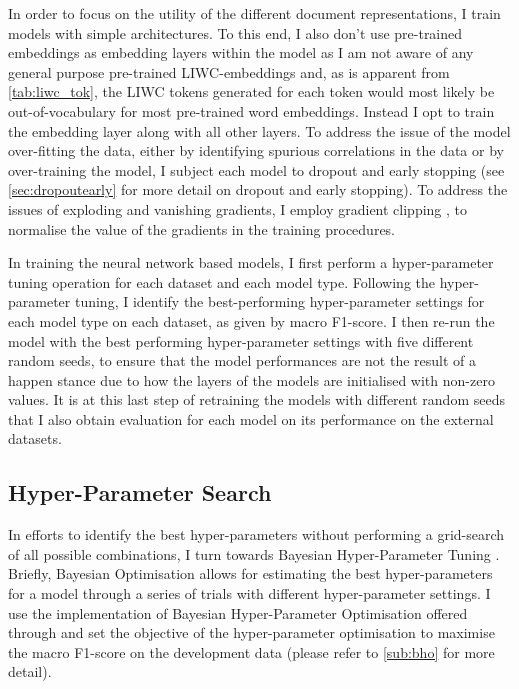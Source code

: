 In order to focus on the utility of the different document representations, I train models with simple architectures. To this end, I also don't use pre-trained embeddings as embedding layers within the model as I am not aware of any general purpose pre-trained LIWC-embeddings and, as is apparent from \cref{tab:liwc_tok}, the LIWC tokens generated for each token would most likely be out-of-vocabulary for most pre-trained word embeddings. Instead I opt to train the embedding layer along with all other layers.
To address the issue of the model over-fitting the data, either by identifying spurious correlations in the data or by over-training the model, I subject each model to dropout and early stopping (see \cref{sec:dropoutearly} for more detail on dropout and early stopping). To address the issues of exploding and vanishing gradients, I employ gradient clipping \citep{Bengio:1994}, to normalise the value of the gradients in the training procedures.\vspace{5mm}

In training the neural network based models, I first perform a hyper-parameter tuning operation for each dataset and each model type. Following the hyper-parameter tuning, I identify the best-performing hyper-parameter settings for each model type on each dataset, as given by macro F1-score. I then re-run the model with the best performing hyper-parameter settings with five different random seeds, to ensure that the model performances are not the result of a happen stance due to how the layers of the models are initialised with non-zero values. It is at this last step of retraining the models with different random seeds that I also obtain evaluation for each model on its performance on the external datasets.

\subsection{Hyper-Parameter Search}\label{sub:liwc_hyperparam}

In efforts to identify the best hyper-parameters without performing a grid-search of all possible combinations, I turn towards Bayesian Hyper-Parameter Tuning \citep{Neal:1996}. Briefly, Bayesian Optimisation allows for estimating the best hyper-parameters for a model through a series of trials with different hyper-parameter settings. I use the implementation of Bayesian Hyper-Parameter Optimisation offered through \citet{Wandb} and set the objective of the hyper-parameter optimisation to maximise the macro F1-score on the development data (please refer to \cref{sub:bho} for more detail).

